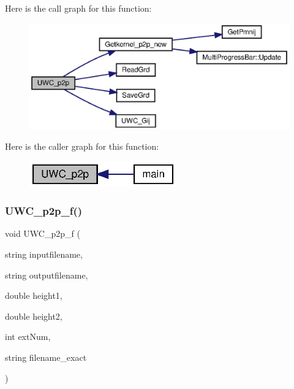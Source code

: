 Here is the call graph for this function\+:
\nopagebreak
\begin{figure}[H]
\begin{center}
\leavevmode
\includegraphics[width=350pt]{Conti2D_8cpp_a7b6bfe9f5b32bc1a62005196d84edfde_a7b6bfe9f5b32bc1a62005196d84edfde_cgraph}
\end{center}
\end{figure}
Here is the caller graph for this function\+:\nopagebreak
\begin{figure}[H]
\begin{center}
\leavevmode
\includegraphics[width=180pt]{Conti2D_8cpp_a7b6bfe9f5b32bc1a62005196d84edfde_a7b6bfe9f5b32bc1a62005196d84edfde_icgraph}
\end{center}
\end{figure}
\mbox{\label{Conti2D_8cpp_af82757cb7e0f4f398e774b4e89b9ea72_af82757cb7e0f4f398e774b4e89b9ea72}} 
\subsubsection{U\+W\+C\+\_\+p2p\+\_\+f()\hspace{0.1cm}{\footnotesize\ttfamily [1/2]}}
{\footnotesize\ttfamily void U\+W\+C\+\_\+p2p\+\_\+f (\begin{DoxyParamCaption}\item[{string}]{inputfilename,  }\item[{string}]{outputfilename,  }\item[{double}]{height1,  }\item[{double}]{height2,  }\item[{int}]{ext\+Num,  }\item[{string}]{filename\+\_\+exact }\end{DoxyParamCaption})}



